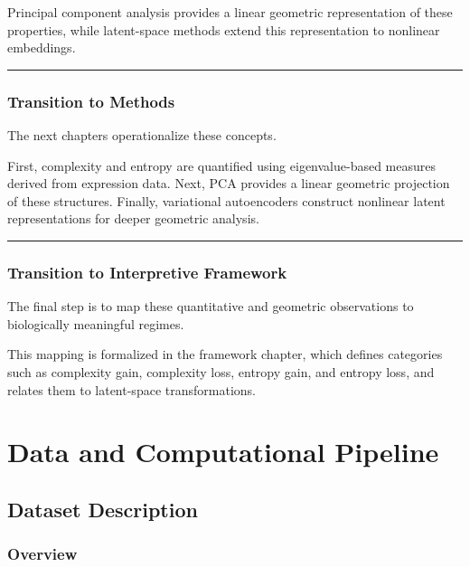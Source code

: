 \documentclass[
  letterpaper,
  DIV=11,
  numbers=noendperiod,
  openany,
  oneside]{scrreprt}
\begin{document}
Principal component analysis provides a linear geometric representation
of these properties, while latent-space methods extend this
representation to nonlinear embeddings.

\begin{center}\rule{0.5\linewidth}{0.5pt}\end{center}

\section{Transition to Methods}\label{transition-to-methods}

The next chapters operationalize these concepts.

First, complexity and entropy are quantified using eigenvalue-based
measures derived from expression data. Next, PCA provides a linear
geometric projection of these structures. Finally, variational
autoencoders construct nonlinear latent representations for deeper
geometric analysis.

\begin{center}\rule{0.5\linewidth}{0.5pt}\end{center}

\section{Transition to Interpretive
Framework}\label{transition-to-interpretive-framework}

The final step is to map these quantitative and geometric observations
to biologically meaningful regimes.

This mapping is formalized in the framework chapter, which defines
categories such as complexity gain, complexity loss, entropy gain, and
entropy loss, and relates them to latent-space transformations.

\part{Data and Computational Pipeline}

\chapter{Dataset Description}\label{dataset-description}

\section{Overview}\label{overview-2}
\end{document}
